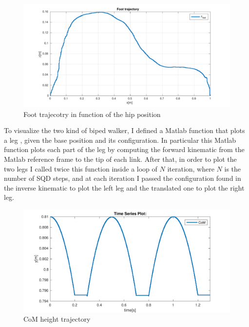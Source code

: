\documentclass[a4paper]{article}
\begin{document}
\begin{figure}
\center
\includegraphics[scale=0.5]{plot/kinematic/foot_trajectory.pdf} 
\caption{Foot trajecotry in function of the hip position} 
\label{fig:foot_trajectory}
\end{figure}


To visualize the two kind of biped walker, I defined a Matlab function that plots a leg , given the base position and its configuration. In particular this Matlab function plots each part of the leg by computing the forward kinematic from the Matlab reference frame to the tip of each  link. After that, in order to plot the two legs I called twice this function inside a loop of $N$ iteration, where $N$ is the number of SQD steps, and at each iteration I passed the configuration found in the inverse kinematic to plot the left leg and the translated one to plot the right leg.



\begin{figure}
\center
\includegraphics[scale=0.7]{plot/com.pdf} 
\caption{CoM height trajectory } 
\label{fig:COM_HEIGT}
\end{figure}
\end{document}
